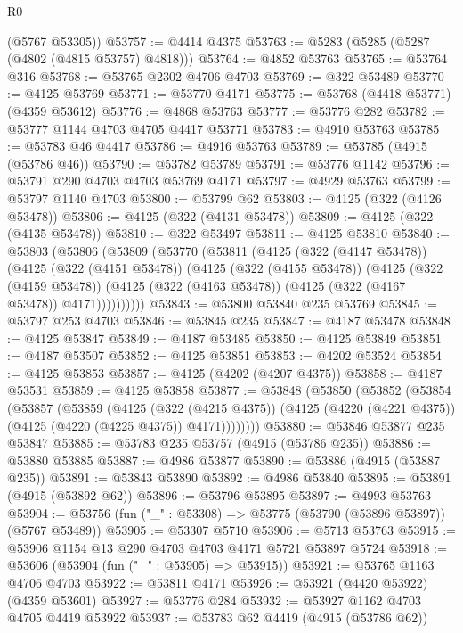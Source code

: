 \begin{lexlean}{R0}
\begin{coremodule}
      (@5767 @53305))
@53757 := @4414 @4375
@53763 := @5283 (@5285 (@5287 (@4802 (@4815 @53757) @4818)))
@53764 := @4852 @53763
@53765 := @53764 @316
@53768 := @53765 @2302 @4706 @4703
@53769 := @322 @53489
@53770 := @4125 @53769
@53771 := @53770 @4171
@53775 := @53768 (@4418 @53771) (@4359 @53612)
@53776 := @4868 @53763
@53777 := @53776 @282
@53782 := @53777 @1144 @4703 @4705 @4417 @53771
@53783 := @4910 @53763
@53785 := @53783 @46 @4417
@53786 := @4916 @53763
@53789 := @53785 (@4915 (@53786 @46))
@53790 := @53782 @53789
@53791 := @53776 @1142
@53796 := @53791 @290 @4703 @4703 @53769 @4171
@53797 := @4929 @53763
@53799 := @53797 @1140 @4703
@53800 := @53799 @62
@53803 := @4125 (@322 (@4126 @53478))
@53806 := @4125 (@322 (@4131 @53478))
@53809 := @4125 (@322 (@4135 @53478))
@53810 := @322 @53497
@53811 := @4125 @53810
@53840 := @53803
    (@53806
      (@53809
        (@53770
          (@53811
            (@4125
              (@322 (@4147 @53478))
              (@4125
                (@322 (@4151 @53478))
                (@4125
                  (@322 (@4155 @53478))
                  (@4125
                    (@322 (@4159 @53478))
                    (@4125 (@322 (@4163 @53478)) (@4125 (@322 (@4167 @53478)) @4171))))))))))
@53843 := @53800 @53840 @235 @53769
@53845 := @53797 @253 @4703
@53846 := @53845 @235
@53847 := @4187 @53478
@53848 := @4125 @53847
@53849 := @4187 @53485
@53850 := @4125 @53849
@53851 := @4187 @53507
@53852 := @4125 @53851
@53853 := @4202 @53524
@53854 := @4125 @53853
@53857 := @4125 (@4202 (@4207 @4375))
@53858 := @4187 @53531
@53859 := @4125 @53858
@53877 := @53848
    (@53850
      (@53852
        (@53854
          (@53857
            (@53859
              (@4125
                (@322 (@4215 @4375))
                (@4125 (@4220 (@4221 @4375)) (@4125 (@4220 (@4225 @4375)) @4171))))))))
@53880 := @53846 @53877 @235 @53847
@53885 := @53783 @235 @53757 (@4915 (@53786 @235))
@53886 := @53880 @53885
@53887 := @4986 @53877
@53890 := @53886 (@4915 (@53887 @235))
@53891 := @53843 @53890
@53892 := @4986 @53840
@53895 := @53891 (@4915 (@53892 @62))
@53896 := @53796 @53895
@53897 := @4993 @53763
@53904 := @53756 (fun ("_" : @53308) => @53775 (@53790 (@53896 @53897)) (@5767 @53489))
@53905 := @53307 @5710
@53906 := @5713 @53763
@53915 := @53906 @1154 @13 @290 @4703 @4703 @4171 @5721 @53897 @5724
@53918 := @53606 (@53904 (fun ("_" : @53905) => @53915))
@53921 := @53765 @1163 @4706 @4703
@53922 := @53811 @4171
@53926 := @53921 (@4420 @53922) (@4359 @53601)
@53927 := @53776 @284
@53932 := @53927 @1162 @4703 @4705 @4419 @53922
@53937 := @53783 @62 @4419 (@4915 (@53786 @62))

\end{coremodule}
\end{lexlean}
